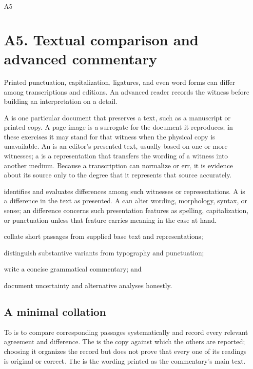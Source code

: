 \begin{courseunit}{A5}
\chapter{A5. Textual comparison and advanced commentary}

Printed punctuation, capitalization, ligatures, and even word forms can differ
among transcriptions and editions. An advanced reader records the witness before
building an interpretation on a detail.

A  is one particular document that preserves a text, such as a
manuscript or printed copy. A page image is a surrogate for the document it
reproduces; in these exercises it may stand for that witness when the physical
copy is unavailable. An  is an editor's presented text, usually
based on one or more witnesses; a  is a representation
that transfers the wording of a witness into another medium. Because a
transcription can normalize or err, it is evidence about its source only to
the degree that it represents that source accurately.

 identifies and evaluates differences among such
witnesses or representations. A  is a difference in the text as
presented. A  can alter wording, morphology, syntax,
or sense; an  difference concerns such presentation features
as spelling, capitalization, or punctuation unless that feature carries
meaning in the case at hand.

\begin{learningobjectives}
  \item collate short passages from supplied base text and representations;
  \item distinguish substantive variants from typography and punctuation;
  \item write a concise grammatical commentary; and
  \item document uncertainty and alternative analyses honestly.
\end{learningobjectives}

\section{A minimal collation}

To  is to compare corresponding passages systematically and
record every relevant agreement and difference. The  is the
copy against which the others are reported; choosing it organizes the record
but does not prove that every one of its readings is original or correct. The
 is the wording printed as the commentary's main text.


\end{courseunit}
